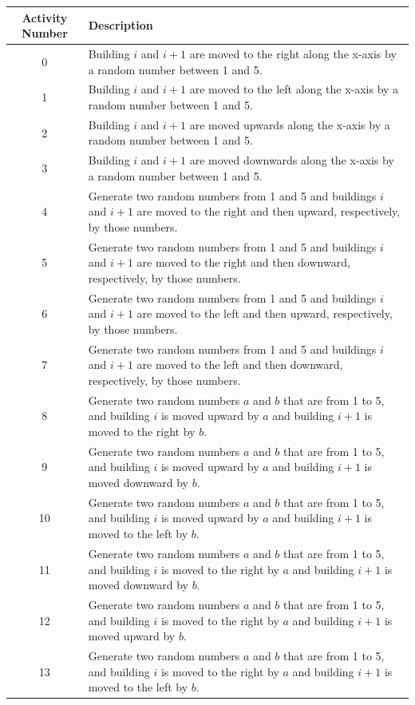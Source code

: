 \begin{longtable}{| c | p{120mm} |}
	\hline
	Activity Number & Description \\
	\hline
	0  & Building $i$ and $i + 1$ are moved to the right along the x-axis by a random number between 1 and 5. \\
	1  & Building $i$ and $i + 1$ are moved to the left along the x-axis by a random number between 1 and 5. \\
	2  & Building $i$ and $i + 1$ are moved upwards along the x-axis by a random number between 1 and 5. \\
	3  & Building $i$ and $i + 1$ are moved downwards along the x-axis by a random number between 1 and 5. \\
	4  & Generate two random numbers from 1 and 5 and buildings $i$ and $i + 1$ are moved to the right and then upward, respectively, by those numbers. \\
	5  & Generate two random numbers from 1 and 5 and buildings $i$ and $i + 1$ are moved to the right and then downward, respectively, by those numbers. \\
	6  & Generate two random numbers from 1 and 5 and buildings $i$ and $i + 1$ are moved to the left and then upward, respectively, by those numbers. \\
	7  & Generate two random numbers from 1 and 5 and buildings $i$ and $i + 1$ are moved to the left and then downward, respectively, by those numbers. \\
	8  & Generate two random numbers $a$ and $b$ that are from 1 to 5, and building $i$ is moved upward by $a$ and building $i + 1$ is moved to the right by $b$. \\
	9  & Generate two random numbers $a$ and $b$ that are from 1 to 5, and building $i$ is moved upward by $a$ and building $i + 1$ is moved downward by $b$. \\
	10 & Generate two random numbers $a$ and $b$ that are from 1 to 5, and building $i$ is moved upward by $a$ and building $i + 1$ is moved to the left by $b$. \\
	11 & Generate two random numbers $a$ and $b$ that are from 1 to 5, and building $i$ is moved to the right by $a$ and building $i + 1$ is moved downward by $b$. \\
	12 & Generate two random numbers $a$ and $b$ that are from 1 to 5, and building $i$ is moved to the right by $a$ and building $i + 1$ is moved upward by $b$. \\
	13 & Generate two random numbers $a$ and $b$ that are from 1 to 5, and building $i$ is moved to the right by $a$ and building $i + 1$ is moved to the left by $b$. \\

\end{longtable}
